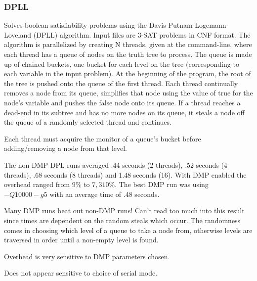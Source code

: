 \subsubsection{DPLL}

Solves boolean satisfiability problems using the
Davis-Putnam-Logemann-Loveland (DPLL) algorithm.  Input files are
3-SAT problems in CNF format.  The algorithm is parallelized by
creating N threads, given at the command-line, where each thread has a
queue of nodes on the truth tree to process.  The queue is made up of
chained buckets, one bucket for each level on the tree (corresponding
to each variable in the input problem).  At the beginning of the
program, the root of the tree is pushed onto the queue of the first
thread.  Each thread continually removes a node from its queue,
simplifies that node using the value of true for the node's variable
and pushes the false node onto its queue.  If a thread reaches a
dead-end in its subtree and has no more nodes on its queue, it steals
a node off the queue of a randomly selected thread and continues.

Each thread must acquire the monitor of a queue's bucket before
adding/removing a node from that level.

The non-DMP DPL runs averaged .44 seconds (2 threads), .52 seconds (4
threads), .68 seconds (8 threads) and 1.48 seconds (16).  With DMP
enabled the overhead ranged from $9\%$ to $7,310\%$.  The best DMP run
was using $-Q10000 -g5$ with an average time of .48 seconds.

Many DMP runs beat out non-DMP runs!  Can't read too much into this
result since times are dependent on the random steals which occur.
The randomness comes in choosing which level of a queue to take a node
from, otherwise levels are traversed in order until a non-empty level
is found.

Overhead is very sensitive to DMP parameters chosen.

Does not appear sensitive to choice of serial mode.


